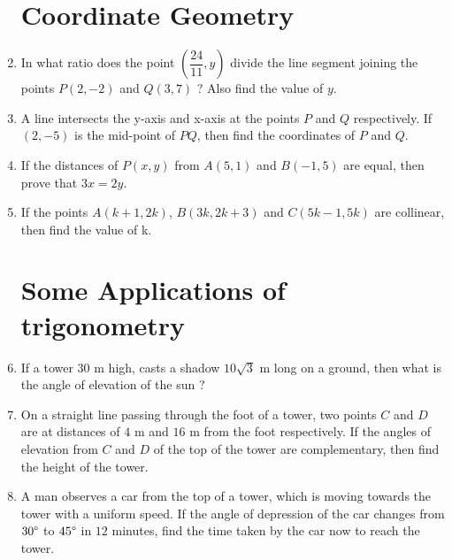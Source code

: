 \documentclass{article}
\providecommand{\brak}[1]{\ensuremath{\left (#1\right)}}
\begin{document}
\begin{enumerate}
\section*{Coordinate Geometry}
\item In what ratio does the point $\brak{\dfrac{24}{11},y}$ divide the line segment joining the points $P\brak{2,-2}$ and $Q\brak{3,7}$ ? Also find the value of $y$.
\item A line intersects the y-axis and x-axis at the points $P$ and $Q$ respectively. If $\brak{2,-5}$ is the mid-point of $PQ$, then find the coordinates of $P$ and $Q$. 
\item If the distances of $P\brak{x,y}$ from $A\brak{5,1}$ and $B\brak{-1,5}$ are equal, then prove that $3x=2y$.
\item If the points $A\brak{k+1, 2k}$, $B\brak{3k, 2k + 3}$  and $C\brak{5k-1, 5k}$ are collinear, then find the value of k.

\section*{Some Applications of trigonometry}
\item If a tower $30$ m high, casts a shadow $10\sqrt{3}$ m long on a ground, then what is the angle of elevation of the sun ?
\item On a straight line passing through the foot of a tower, two points $C$ and $D$ are at distances of $4$ m and $16$ m from the foot respectively. If the angles of elevation from $C$ and $D$ of the top of the tower are complementary, then  find the  height of the tower.
\item A man observes a car from the top of a tower, which is  moving towards the tower with a uniform speed. If the angle of depression of the car changes from $30\degree$ to $45\degree$ in $12$ minutes, find the time taken by the car now to reach the tower.


\end{enumerate}
\end{document}
